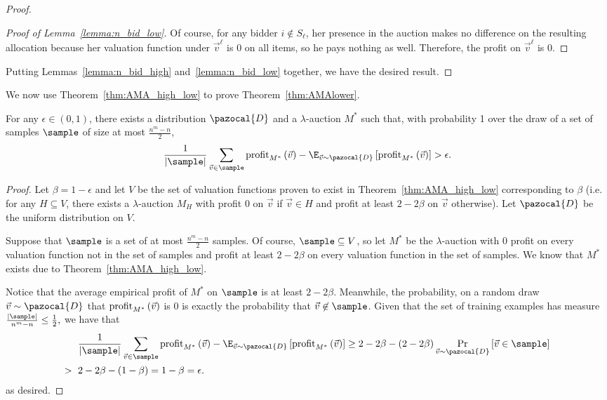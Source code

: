 \begin{proof}
\begin{proof}[Proof of Lemma~\ref{lemma:n_bid_low}]
Of course, for any bidder $i \not\in S_\ell$, her presence in the auction makes no difference on the resulting allocation because her valuation function under $\vec{v}^\ell$ is 0 on all items, so he pays nothing as well. Therefore, the profit on $\vec{v}^\ell$ is 0.
\end{proof}

Putting Lemmas~\ref{lemma:n_bid_high} and~\ref{lemma:n_bid_low} together, we have the desired result.
\end{proof}

We now use Theorem~\ref{thm:AMA_high_low} to prove Theorem~\ref{thm:AMAlower}.

\begin{theorem}\label{thm:AMAlower}
For any $\epsilon \in (0,1)$, there exists a distribution $\pazocal{D}$ and a $\lambda$-auction $M^*$ such that, with probability 1 over the draw of a set of samples $\sample$ of size at most $\frac{n^m-n}{2}$, \[\frac{1}{|\sample|}\sum_{\vec{v} \in \sample} {\normalfont \profit}_{M^*} \left(\vec{v}\right) - \E_{\vec{v}\sim \pazocal{D}}\left[ {\normalfont \profit}_{M^*}\left(\vec{v}\right)\right] > \epsilon.\]
\end{theorem}

\begin{proof}
Let $\beta = 1 - \epsilon$ and let $V$ be the set of valuation functions proven to exist in Theorem~\ref{thm:AMA_high_low} corresponding to $\beta$ (i.e. for any $H \subseteq V$, there exists a $\lambda$-auction $M_H$ with profit 0 on $\vec{v}$ if $\vec{v} \in H$ and profit at least $2-2\beta$ on $\vec{v}$ otherwise). Let $\pazocal{D}$ be the uniform distribution on $V$.

Suppose that $\sample$ is a set of at most $\frac{n^m-n}{2}$ samples. Of course, $\sample \subseteq V$, so let $M^*$ be the $\lambda$-auction with 0 profit on every valuation function not in the set of samples and profit at least $2 - 2\beta$ on every valuation function in the set of samples. We know that $M^*$ exists due to Theorem~\ref{thm:AMA_high_low}.

Notice that the average empirical profit of $M^*$ on $\sample$ is at least $2 - 2\beta$. Meanwhile, the probability, on a random draw $\vec{v} \sim \pazocal{D}$ that ${\normalfont \textnormal{profit}}_{M^*}\left(\vec{v}\right)$ is 0 is exactly the probability that $\vec{v} \not\in \sample$. Given that the set of training examples has measure $\frac{|\sample|}{n^m - n}\leq\frac{1}{2},$ we have that \begin{align*}
&\frac{1}{|\sample|}\sum_{\vec{v} \in \sample} {\normalfont \profit}_{M^*} \left(\vec{v}\right) - \E_{\vec{v}\sim \pazocal{D}}\left[ {\normalfont \profit}_{M^*}\left(\vec{v}\right)\right] \geq 2-2\beta - (2-2\beta)\Pr_{\vec{v}\sim\pazocal{D}}\left[\vec{v} \in \sample\right]\\
>\text{ }&2-2\beta - (1-\beta) = 1-\beta = \epsilon.
\end{align*}
as desired.
\end{proof}

